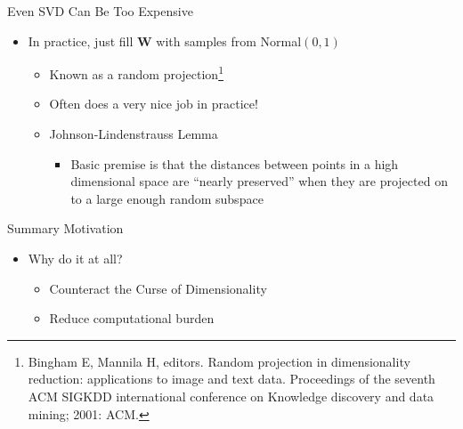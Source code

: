 \documentclass[aspectratio=169]{beamer}
\begin{document}
\begin{frame}{Even SVD Can Be Too Expensive}

\begin{itemize}
\item In practice, just fill $\textbf{W}$ with samples from Normal$(0,1)$
	\begin{itemize}
	\item Known as a random projection\footnote{Bingham E, Mannila H, editors. Random projection in dimensionality reduction: applications to image and text data. Proceedings of the seventh ACM SIGKDD international conference on Knowledge discovery and data mining; 2001: ACM.}
	\item Often does a very nice job in practice!
	\item Johnson-Lindenstrauss Lemma
	\begin{itemize}
	\item Basic premise is that the distances between points in a high dimensional space are ``nearly preserved'' when they are projected on to a large enough random subspace
	
 	\end{itemize}

	\end{itemize}
\end{itemize}
\end{frame}
\begin{frame}{Summary Motivation}

\begin{itemize}
\item Why do it at all?
\begin{itemize}
\item Counteract the Curse of Dimensionality
\item Reduce computational burden
\end{itemize}
\end{itemize}
\end{frame}
\end{document}

